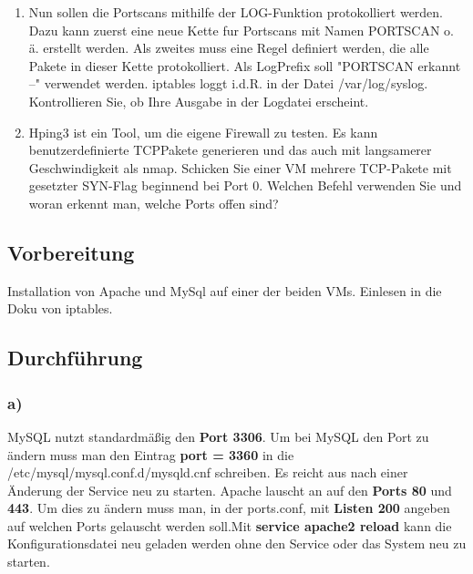 \begin{enumerate}[label=(\alph*)]
	\item Nun sollen die Portscans mithilfe der LOG-Funktion protokolliert werden. Dazu kann zuerst eine neue Kette fur Portscans mit Namen PORTSCAN o. ä. erstellt werden. Als zweites muss eine Regel definiert werden, die alle Pakete in dieser Kette protokolliert. Als LogPrefix soll "PORTSCAN erkannt --" verwendet werden. iptables loggt i.d.R. in der Datei /var/log/syslog. Kontrollieren Sie, ob Ihre Ausgabe in der Logdatei erscheint.
	\item Hping3 ist ein Tool, um die eigene Firewall zu testen. Es kann benutzerdefinierte TCPPakete generieren und das auch mit langsamerer Geschwindigkeit als nmap. Schicken Sie einer VM mehrere TCP-Pakete mit gesetzter SYN-Flag beginnend bei Port 0. Welchen Befehl verwenden Sie und woran erkennt man, welche Ports offen sind?
\end{enumerate}

\subsection{Vorbereitung}
Installation von Apache und MySql auf einer der beiden VMs. Einlesen in die Doku von iptables.

\subsection{Durchführung}

\subsubsection{a)}
MySQL nutzt standardmäßig den \textbf{Port 3306}. Um bei MySQL den Port zu ändern muss man den Eintrag \textbf{port = 3360} in die /etc/mysql/mysql.conf.d/mysqld.cnf schreiben. Es reicht aus nach einer Änderung der Service neu zu starten. Apache lauscht an auf den \textbf{Ports 80} und \textbf{443}. Um dies zu ändern muss man, in der ports.conf, mit \textbf{Listen 200} angeben auf welchen Ports gelauscht werden soll.Mit \textbf{service apache2 reload} kann die Konfigurationsdatei neu geladen werden ohne den Service oder das System neu zu starten.


